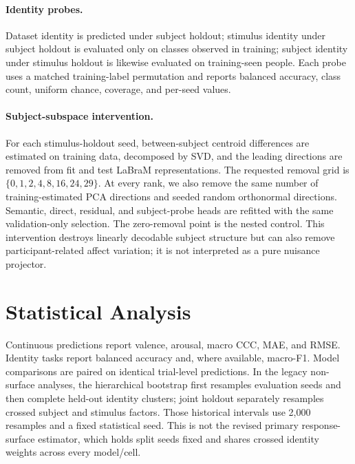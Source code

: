 \paragraph{Identity probes.}
Dataset identity is predicted under subject holdout; stimulus identity under
subject holdout is evaluated only on classes observed in training; subject
identity under stimulus holdout is likewise evaluated on training-seen people.
Each probe uses a matched training-label permutation and reports balanced
accuracy, class count, uniform chance, coverage, and per-seed values.

\paragraph{Subject-subspace intervention.}
For each stimulus-holdout seed, between-subject centroid differences are
estimated on training data, decomposed by SVD, and the leading directions are
removed from fit and test LaBraM representations. The requested removal grid is
$\{0,1,2,4,8,16,24,29\}$. At every rank, we also remove the same number of
training-estimated PCA directions and seeded random orthonormal directions.
Semantic, direct, residual, and subject-probe heads are refitted with the same
validation-only selection. The zero-removal point is the nested control.
This intervention destroys linearly decodable subject structure but can also
remove participant-related affect variation; it is not interpreted as a pure
nuisance projector.

\section{Statistical Analysis}

Continuous predictions report valence, arousal, macro CCC, MAE, and RMSE.
Identity tasks report balanced accuracy and, where available, macro-F1. Model
comparisons are paired on identical trial-level predictions. In the legacy
non-surface analyses, the hierarchical
bootstrap first resamples evaluation seeds and then complete held-out identity
clusters; joint holdout separately resamples crossed subject and stimulus
factors. Those historical intervals use 2,000 resamples and a fixed statistical
seed. This is not the revised primary response-surface estimator, which holds
split seeds fixed and shares crossed identity weights across every model/cell.

